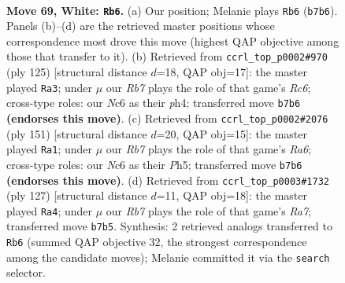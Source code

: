 \documentclass[11pt]{article}
\begin{document}
\clearpage

\begin{figure}[p]\centering
\begin{subfigure}{0.46\textwidth}\centering
\resizebox{\linewidth}{!}{%
\newchessgame
\chessboard[
  setfen={8/1R4p1/2N2pk1/7p/3P3P/6PK/2r5/8 w - - 31 69},
  showmover=false,
  pgfstyle=straightmove, color=movearrow, markmove={b7-b6}
]}
\caption{}
\end{subfigure}\hfill
\begin{subfigure}{0.46\textwidth}\centering
\resizebox{\linewidth}{!}{%
\newchessgame
\chessboard[
  setfen={1R6/5pk1/4p1p1/4P3/5PKP/2r3P1/8/8 b - - 44 63},
  showmover=false,
  pgfstyle=straightmove, color=movearrow, markmove={c3-a3}
]}
\caption{}
\end{subfigure}
\\[4pt]
\begin{subfigure}{0.46\textwidth}\centering
\resizebox{\linewidth}{!}{%
\newchessgame
\chessboard[
  setfen={8/5pk1/6p1/2R4p/4PK1P/r4PP1/8/8 b - - 26 76},
  showmover=false,
  pgfstyle=straightmove, color=movearrow, markmove={a3-a1}
]}
\caption{}
\end{subfigure}\hfill
\begin{subfigure}{0.46\textwidth}\centering
\resizebox{\linewidth}{!}{%
\newchessgame
\chessboard[
  setfen={8/4R3/6pk/p6p/7P/5PK1/r5P1/8 b - - 1 64},
  showmover=false,
  pgfstyle=straightmove, color=movearrow, markmove={a2-a4}
]}
\caption{}
\end{subfigure}
\caption{\textbf{Move 69, White: \texttt{Rb6}.} (a) Our position; Melanie plays \texttt{Rb6} (\texttt{b7b6}). Panels (b)--(d) are the retrieved master positions whose correspondence most drove this move (highest QAP objective among those that transfer to it). (b) Retrieved from \texttt{ccrl\_top\_p0002\#970} (ply 125) [structural distance $d$=18, QAP obj=17]: the master played \texttt{Ra3}; under $\mu$ our \emph{Rb7} plays the role of that game's \emph{Rc6}; cross-type roles: our \emph{N}c6 as their \emph{p}h4; transferred move \texttt{b7b6} \textbf{(endorses this move)}. (c) Retrieved from \texttt{ccrl\_top\_p0002\#2076} (ply 151) [structural distance $d$=20, QAP obj=15]: the master played \texttt{Ra1}; under $\mu$ our \emph{Rb7} plays the role of that game's \emph{Ra6}; cross-type roles: our \emph{N}c6 as their \emph{P}h5; transferred move \texttt{b7b6} \textbf{(endorses this move)}. (d) Retrieved from \texttt{ccrl\_top\_p0003\#1732} (ply 127) [structural distance $d$=11, QAP obj=18]: the master played \texttt{Ra4}; under $\mu$ our \emph{Rb7} plays the role of that game's \emph{Ra7}; transferred move \texttt{b7b5}. Synthesis: 2 retrieved analogs transferred to \texttt{Rb6} (summed QAP objective 32, the strongest correspondence among the candidate moves); Melanie committed it via the \texttt{search} selector.}
\label{fig:thought-m136}
\end{figure}
\end{document}
